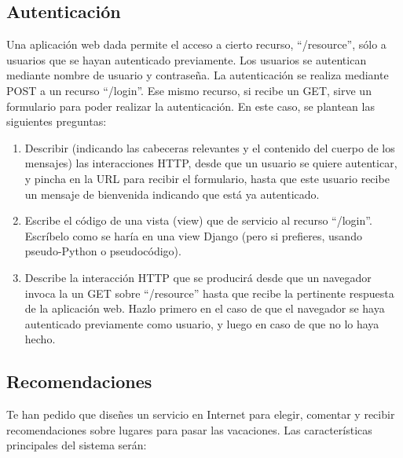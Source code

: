 \subsection{Autenticación}

Una aplicación web dada permite el acceso a cierto recurso, ``/resource'', sólo a usuarios que se hayan autenticado previamente. Los usuarios se autentican mediante nombre de usuario y contraseña. La autenticación se realiza mediante POST a un recurso ``/login''. Ese mismo recurso, si recibe un GET, sirve un formulario para poder realizar la autenticación. En este caso, se plantean las siguientes preguntas:

\begin{enumerate}
\item Describir (indicando las cabeceras relevantes y el contenido del cuerpo de los mensajes) las interacciones HTTP, desde que un usuario se quiere autenticar, y pincha en la URL para recibir el formulario, hasta que este usuario recibe un mensaje de bienvenida indicando que está ya autenticado.
\item Escribe el código de una vista (view) que de servicio al recurso ``/login''. Escríbelo como se haría en una view Django (pero si prefieres, usando pseudo-Python o pseudocódigo).
\item Describe la interacción HTTP que se producirá desde que un navegador invoca la un GET sobre ``/resource'' hasta que recibe la pertinente respuesta de la aplicación web. Hazlo primero en el caso de que el navegador se haya autenticado previamente como usuario, y luego en caso de que no lo haya hecho.
\end{enumerate}

\subsection{Recomendaciones}

Te han pedido que diseñes un servicio en Internet para elegir, comentar y recibir recomendaciones sobre lugares para pasar las vacaciones. Las características principales del sistema serán:

